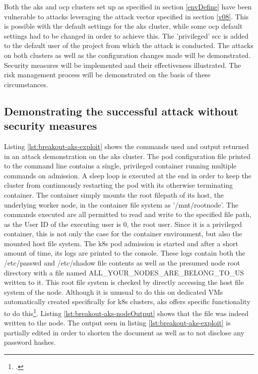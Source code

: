 Both the \gls{aks} and \gls{ocp} clusters set up as specified in section \ref{envDefine} have been vulnerable to attacks leveraging the attack vector specified in section \ref{v08}. This is possible with the default settings for the \gls{aks} cluster, while some \gls{ocp} default settings had to be changed in order to achieve this.
The 'privileged' \gls{scc} is added to the default user of the project from which the attack is conducted.
The attacks on both clusters as well as the configuration changes made will be demonstrated. Security measures will be implemented and their effectiveness illustrated. The risk management process will be demonstrated on the basis of these circumstances.

\subsection{Demonstrating the successful attack without security measures} \label{v08attack}
Listing \ref{lst:breakout-aks-exploit} shows the commands used and output returned in an attack demonstration on the \gls{aks} cluster.
The pod configuration file printed to the command line contains a single, privileged container running multiple commands on admission.
A sleep loop is executed at the end in order to keep the cluster from continuously restarting the pod with its otherwise terminating container.
The container simply mounts the root filepath of its host, the underlying worker node, in the container file system as '/mnt/rootnode'. 
The commands executed are all permitted to read and write to the specified file path, as the User ID of the executing user is 0, the root user. Since it is a privileged container, this is not only the case for the container environment, but also the mounted host file system.
The \gls{k8s} pod admission is started and after a short amount of time, its logs are printed to the console. 
These logs contain both the {\slash}etc{\slash}passwd and {\slash}etc{\slash}shadow file contents as well as the presumed node root directory with a file named ALL{\_}YOUR{\_}NODES{\_}ARE{\_}BELONG{\_}TO{\_}US written to it.
This root file system is checked by directly accessing the host file system of the node. Although it is unusual to do this on dedicated VMs automatically created specifically for \gls{k8s} clusters, \gls{aks} offers specific functionality to do this\footcite{aksNodeSsh}. Listing \ref{lst:breakout-aks-nodeOutput} shows that the file was indeed written to the node.
The output seen in listing \ref{lst:breakout-aks-exploit} is partially edited in order to shorten the document as well as to not disclose any password hashes.

